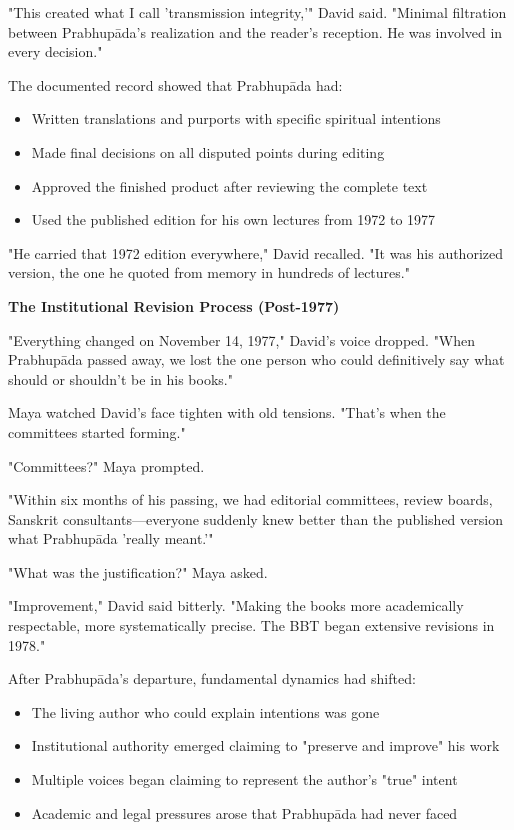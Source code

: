 \documentclass[12pt,twoside]{book}
\begin{document}
"This created what I call 'transmission integrity,'" David said. "Minimal filtration between Prabhupāda's realization and the reader's reception. He was involved in every decision."

The documented record showed that Prabhupāda had:
\begin{itemize}
\item Written translations and purports with specific spiritual intentions
\item Made final decisions on all disputed points during editing
\item Approved the finished product after reviewing the complete text
\item Used the published edition for his own lectures from 1972 to 1977
\end{itemize}

"He carried that 1972 edition everywhere," David recalled. "It was his authorized version, the one he quoted from memory in hundreds of lectures."


\vspace{0.5cm}
\textbf{The Institutional Revision Process (Post-1977)}
\vspace{0.2cm}


"Everything changed on November 14, 1977," David's voice dropped. "When Prabhupāda passed away, we lost the one person who could definitively say what should or shouldn't be in his books."

Maya watched David's face tighten with old tensions. "That's when the committees started forming."

"Committees?" Maya prompted.

"Within six months of his passing, we had editorial committees, review boards, Sanskrit consultants—everyone suddenly knew better than the published version what Prabhupāda 'really meant.'"

"What was the justification?" Maya asked.

"Improvement," David said bitterly. "Making the books more academically respectable, more systematically precise. The BBT began extensive revisions in 1978."

After Prabhupāda's departure, fundamental dynamics had shifted:
\begin{itemize}
\item The living author who could explain intentions was gone
\item Institutional authority emerged claiming to "preserve and improve" his work
\item Multiple voices began claiming to represent the author's "true" intent
\item Academic and legal pressures arose that Prabhupāda had never faced
\end{itemize}
\end{document}
